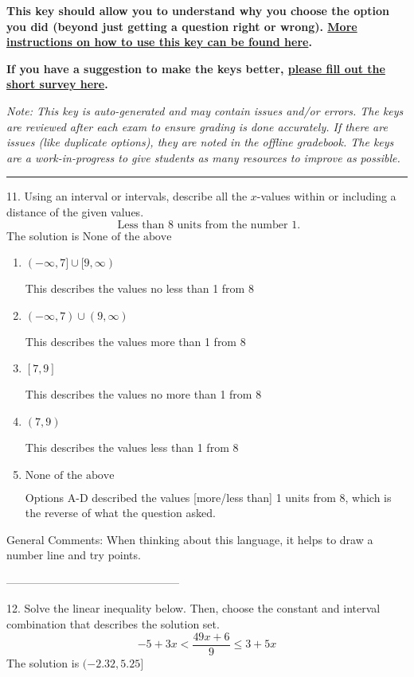 \documentclass{article}[14pt]
\begin{document}
\textbf{This key should allow you to understand why you choose the option you did (beyond just getting a question right or wrong). \href{https://xronos.clas.ufl.edu/mac1105spring2020/courseDescriptionAndMisc/Exams/LearningFromResults}{More instructions on how to use this key can be found here}.}

\textbf{If you have a suggestion to make the keys better, \href{https://forms.gle/CZkbZmPbC9XALEE88}{please fill out the short survey here}.}

\textit{Note: This key is auto-generated and may contain issues and/or errors. The keys are reviewed after each exam to ensure grading is done accurately. If there are issues (like duplicate options), they are noted in the offline gradebook. The keys are a work-in-progress to give students as many resources to improve as possible.}

\rule{\textwidth}{0.4pt}

11. Using an interval or intervals, describe all the $x$-values within or including a distance of the given values.
$$ \text{ Less than } 8 \text{ units from the number } 1. $$ 
The solution is $ \text{None of the above} $ 

\begin{enumerate}[label=\Alph*.] 
\item $ (-\infty, 7] \cup [9, \infty) $ 

 This describes the values no less than 1 from 8 
\item $ (-\infty, 7) \cup (9, \infty) $ 

 This describes the values more than 1 from 8 
\item $ [7, 9] $ 

 This describes the values no more than 1 from 8 
\item $ (7, 9) $ 

 This describes the values less than 1 from 8 
\item $ \text{None of the above} $ 

 Options A-D described the values [more/less than] 1 units from 8, which is the reverse of what the question asked. 
\end{enumerate} 
 
General Comments: When thinking about this language, it helps to draw a number line and try points.

-----------------------------------------------

12. Solve the linear inequality below. Then, choose the constant and interval combination that describes the solution set.
$$ -5 + 3 x < \frac{49 x + 6}{9} \leq 3 + 5 x $$ 
The solution is $ (-2.32, 5.25] $ 
\end{document}
